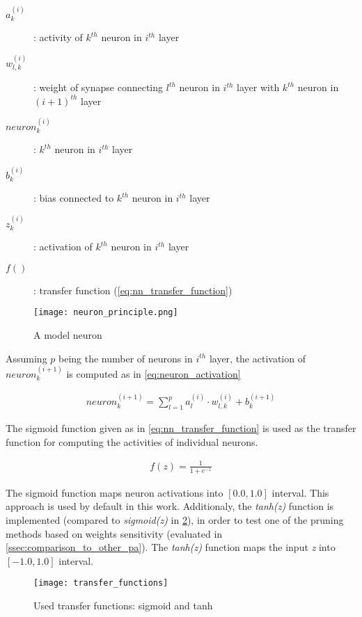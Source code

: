 \begin{description}
\item[$ a_k^{(i)} $] : activity of $ k^{th} $ neuron in $ i^{th} $ layer
\item[$ w_{l, k}^{(i)} $] : weight of synapse connecting $ l^{th} $ neuron in $ i^{th} $ layer with $ k^{th} $ neuron in $ (i+1)^{th} $ layer
\item[$ neuron_k^{(i)} $] : $ k^{th} $ neuron in $ i^{th} $ layer
\item[$ b_k^{(i)} $] : bias connected to $ k^{th} $ neuron in $ i^{th} $ layer
\item[$ z_k^{(i)} $] : activation of $ k^{th} $ neuron in $ i^{th} $ layer
\item[$ f() $] : transfer function (\cref{eq:nn_transfer_function})
\end{description}

\begin{figure}[H]
  \centering
  \texttt{[image: neuron\_principle.png]}
  \caption{A model neuron}
  \label{img:model_neuron}
\end{figure}

Assuming $ p $ being the number of neurons in $ i^{th} $ layer, the activation of $ neuron_k^{(i+1)} $ is computed as in \ref{eq:neuron_activation}

\begin{align} \label{eq:neuron_activation}
neuron_k^{(i+1)} = \displaystyle{\sum_{l=1}^{p} a_l^{(i)} \cdot w_{l,k}^{(i)}} + b_k^{(i+1)}
\end{align}

The sigmoid function given as in \cref{eq:nn_transfer_function} is used as the transfer function for computing the activities of individual neurons.

\begin{align} \label{eq:nn_transfer_function}
f(z) = \frac{1}{1 + e^{-z}}
\end{align}

The sigmoid function maps neuron activations into $ [0.0, 1.0] $ interval. This approach is used by default in this work. Additionaly, the \textit{tanh(z)} function is implemented (compared to \textit{sigmoid(z)} in \cref{fig:transfer_functions}), in order to test one of the pruning methods based on weights sensitivity (evaluated in \cref{ssec:comparison_to_other_pa}). The \textit{tanh(z)} function maps the input \textit{z} into $ [-1.0, 1.0] $ interval.

\begin{figure}[H]
  \centering
  \texttt{[image: transfer\_functions]}
  \caption{Used transfer functions: sigmoid and tanh}
  \label{fig:transfer_functions}
\end{figure}

